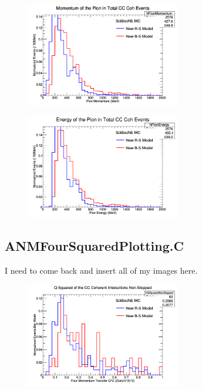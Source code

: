 \documentclass[11pt]{article}
\begin{document}
\begin{figure}[H]
\centering
\includegraphics[width=0.6\textwidth]{ANMPionPlottingImages/11-ANMPionPlotting.png}
\caption{}
\end{figure}

\begin{figure}[H]
\centering
\includegraphics[width=0.6\textwidth]{ANMPionPlottingImages/12-ANMPionPlotting.png}
\caption{}
\end{figure}

\subsection{ANMFourSquaredPlotting.C}
I need to come back and insert all of my images here.

\begin{figure}[H]
\centering
\includegraphics[width=0.6\textwidth]{ANMFourSquaredPlottingImages/1-ANMFourSquaredPlotting.png}
\caption{}
\end{figure}
\end{document}

